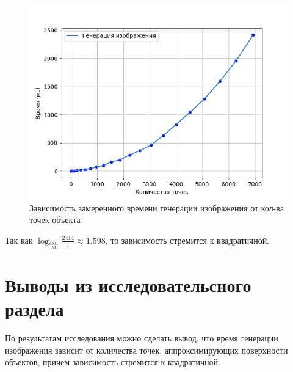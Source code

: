     \begin{figure}[h!]
        \centering
        \includegraphics[scale=0.8]{inc/graph.png}
        \caption{Зависимость замеренного времени генерации изображения от кол-ва точек объекта}
        \label{schema:graph}
    \end{figure}\clearpage
    \par Так как \begin{math} \log_{\frac{6931}{53}}{\frac{2414}{1}} \approx 1.598\end{math}, то зависимость стремится к квадратичной.
    \section{Выводы из исследовательсного раздела}
    \par По результатам исследования можно сделать вывод, что время генерации изображения зависит от количества точек, аппроксимирующих поверхности объектов, причем зависимость стремится к квадратичной.
\newpage